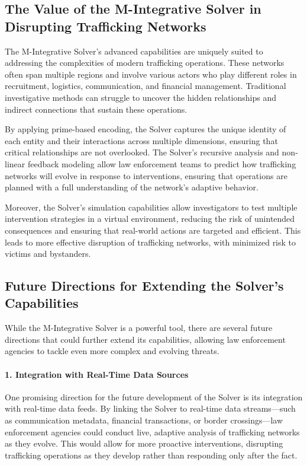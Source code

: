 \documentclass[%
 preprint, linenumbers,
 amsmath,amssymb,
 aps, physrev,
]{revtex4-2}
\begin{document}
\subsection{The Value of the M-Integrative Solver in Disrupting Trafficking Networks}

The M-Integrative Solver's advanced capabilities are uniquely suited to addressing the complexities of modern trafficking operations. These networks often span multiple regions and involve various actors who play different roles in recruitment, logistics, communication, and financial management. Traditional investigative methods can struggle to uncover the hidden relationships and indirect connections that sustain these operations.

By applying prime-based encoding, the Solver captures the unique identity of each entity and their interactions across multiple dimensions, ensuring that critical relationships are not overlooked. The Solver's recursive analysis and non-linear feedback modeling allow law enforcement teams to predict how trafficking networks will evolve in response to interventions, ensuring that operations are planned with a full understanding of the network’s adaptive behavior.

Moreover, the Solver's simulation capabilities allow investigators to test multiple intervention strategies in a virtual environment, reducing the risk of unintended consequences and ensuring that real-world actions are targeted and efficient. This leads to more effective disruption of trafficking networks, with minimized risk to victims and bystanders.

\subsection{Future Directions for Extending the Solver's Capabilities}

While the M-Integrative Solver is a powerful tool, there are several future directions that could further extend its capabilities, allowing law enforcement agencies to tackle even more complex and evolving threats.

\paragraph{1. Integration with Real-Time Data Sources}
One promising direction for the future development of the Solver is its integration with real-time data feeds. By linking the Solver to real-time data streams—such as communication metadata, financial transactions, or border crossings—law enforcement agencies could conduct live, adaptive analysis of trafficking networks as they evolve. This would allow for more proactive interventions, disrupting trafficking operations as they develop rather than responding only after the fact.
\end{document}
